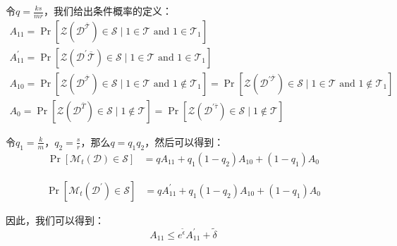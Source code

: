 令$q=\frac{k s}{m r}$，我们给出条件概率的定义：
\begin{equation}\label{eq:隐私性证明5}
\begin{array}{l}
A_{11}=\operatorname{Pr}\left[\mathcal{Z}\left(\mathcal{D}^{\overline{\mathcal{T}}}\right) \in \mathcal{S} \mid 1 \in \mathcal{T} \text { and } 1 \in \mathcal{T}_{1}\right] \\
A_{11}^{\prime}=\operatorname{Pr}\left[\mathcal{Z}\left(\mathcal{D}^{\prime} \overline{\mathcal{T}}\right) \in \mathcal{S} \mid 1 \in \mathcal{T} \text { and } 1 \in \mathcal{T}_{1}\right] \\
A_{10}=\operatorname{Pr}\left[\mathcal{Z}\left(\mathcal{D}^{\overline{\mathcal{T}}}\right) \in \mathcal{S} \mid 1 \in \mathcal{T} \text { and } 1 \notin \mathcal{T}_{1}\right]=\operatorname{Pr}\left[\mathcal{Z}\left(\mathcal{D}^{\prime \overline{\mathcal{T}}}\right) \in \mathcal{S} \mid 1 \in \mathcal{T} \text { and } 1 \notin \mathcal{T}_{1}\right] \\
A_{0}=\operatorname{Pr}\left[\mathcal{Z}\left(\mathcal{D}^{\bar{T}}\right) \in \mathcal{S} \mid 1 \notin \mathcal{T}\right]=\operatorname{Pr}\left[\mathcal{Z}\left(\mathcal{D}^{\prime \bar{\tau}}\right) \in \mathcal{S} \mid 1 \notin \mathcal{T}\right]
\end{array}
\end{equation}

令$q_{1}=\frac{k}{m}$，$q_{2}=\frac{s}{r}$，那么$q=q_{1} q_{2}$，然后可以得到：
\begin{equation}\label{eq:隐私性证明6}
\begin{aligned} 
\operatorname{Pr}\left[\mathcal{M}_{t}(\mathcal{D}) \in \mathcal{S}\right] &=q A_{11}+q_{1}\left(1-q_{2}\right) A_{10}+\left(1-q_{1}\right) A_{0}
\end{aligned}
\end{equation}

\begin{equation}\label{eq:隐私性证明7}
\begin{aligned} 
\operatorname{Pr}\left[\mathcal{M}_{t}\left(\mathcal{D}^{\prime}\right) \in \mathcal{S}\right] &=q A_{11}^{\prime}+q_{1}\left(1-q_{2}\right) A_{10}+\left(1-q_{1}\right) A_{0} 
\end{aligned}
\end{equation}

因此，我们可以得到：
\begin{equation}\label{隐私性证明8}
A_{11} \leq e^{\tilde{\epsilon}} A_{11}^{\prime}+\tilde{\delta}
\end{equation}

